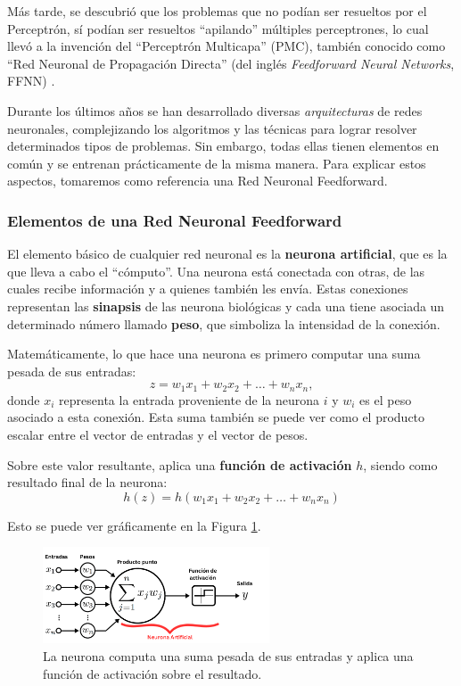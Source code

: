 \documentclass[../../main.tex]{subfiles}
\begin{document}
Más tarde, se descubrió que los problemas que no podían ser resueltos por el Perceptrón, sí podían ser resueltos ``apilando'' múltiples perceptrones, lo cual llevó a la invención del ``Perceptrón Multicapa'' (PMC), también conocido como ``Red Neuronal de Propagación Directa'' (del inglés \textit{Feedforward Neural Networks}, FFNN) \cite{deep-learning}. 

Durante los últimos años se han desarrollado diversas \textit{arquitecturas} de redes neuronales, complejizando los algoritmos y las técnicas para lograr resolver determinados tipos de problemas. Sin embargo, todas ellas tienen elementos en común y se entrenan prácticamente de la misma manera. Para explicar estos aspectos, tomaremos como referencia una Red Neuronal Feedforward.

\subsubsection{Elementos de una Red Neuronal Feedforward}

El elemento básico de cualquier red neuronal es la \textbf{neurona artificial}, que es la que lleva a cabo el ``cómputo''. Una neurona está conectada con otras, de las cuales recibe información y a quienes también les envía. Estas conexiones representan las \textbf{sinapsis} de las neurona biológicas y cada una tiene asociada un determinado número llamado \textbf{peso}, que simboliza la intensidad de la conexión. 

Matemáticamente, lo que hace una neurona es primero computar una suma pesada de sus entradas:
\[z = w_1x_1 + w_2x_2 + \dots + w_nx_n,\]
donde \(x_i\) representa la entrada proveniente de la neurona \(i\) y \(w_i\) es el peso asociado a esta conexión. Esta suma también se puede ver como el producto escalar entre el vector de entradas y el vector de pesos.

Sobre este valor resultante, aplica una \textbf{función de activación} \(h\), siendo como resultado final de la neurona:
\[h(z) = h(w_1x_1 + w_2x_2 + \dots + w_nx_n)\]

Esto se puede ver gráficamente en la Figura \ref{fig:neuron}.

\begin{figure}[h!]
    \centering
    \includegraphics[width=0.6\textwidth]{figs/neurona.png}
    \caption{La neurona computa una suma pesada de sus entradas y aplica una función de activación sobre el resultado.}
    \label{fig:neuron}
\end{figure}
\end{document}
